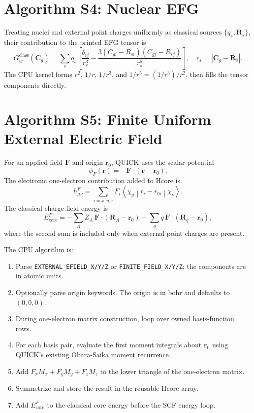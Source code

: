 \documentclass[journal=jcisd8,manuscript=suppinfo]{achemso}
\begin{document}
\section{Algorithm S4: Nuclear EFG}

Treating nuclei and external point charges uniformly as classical sources
\(\{q_s,\mathbf{R}_s\}\), their contribution to the printed EFG tensor is
\begin{equation}
  G_{ij}^{\mathrm{class}}(\mathbf{C}_g)
  =
  \sum_s q_s
  \left[
    \frac{\delta_{ij}}{r_s^3}
    -
    \frac{3(C_{gi}-R_{si})(C_{gj}-R_{sj})}{r_s^5}
  \right],
  \quad
  r_s=|\mathbf{C}_g-\mathbf{R}_s|.
\end{equation}
The CPU kernel forms \(r^2\), \(1/r\), \(1/r^3\), and \(1/r^5=(1/r^3)/r^2\), then fills the tensor components directly.

\section{Algorithm S5: Finite Uniform External Electric Field}

For an applied field \(\mathbf{F}\) and origin \(\mathbf{r}_0\), QUICK uses the scalar potential
\begin{equation}
  \phi_F(\mathbf{r})=-\mathbf{F}\cdot(\mathbf{r}-\mathbf{r}_0).
\end{equation}
The electronic one-electron contribution added to Hcore is
\begin{equation}
  h^F_{\mu\nu}
  =
  \sum_{i=x,y,z}F_i
  \left\langle
    \chi_\mu
    \middle|
    r_i-r_{0i}
    \middle|
    \chi_\nu
  \right\rangle.
\end{equation}
The classical charge-field energy is
\begin{equation}
  E^F_{\mathrm{core}}
  =
  -\sum_A Z_A\,\mathbf{F}\cdot(\mathbf{R}_A-\mathbf{r}_0)
  -
  \sum_q q\,\mathbf{F}\cdot(\mathbf{R}_q-\mathbf{r}_0),
\end{equation}
where the second sum is included only when external point charges are present.

The CPU algorithm is:
\begin{enumerate}
  \item Parse \texttt{EXTERNAL\_EFIELD\_X/Y/Z} or \texttt{FINITE\_FIELD\_X/Y/Z}; the components are in atomic units.
  \item Optionally parse origin keywords.  The origin is in bohr and defaults to \((0,0,0)\).
  \item During one-electron matrix construction, loop over owned basis-function rows.
  \item For each basis pair, evaluate the first moment integrals about \(\mathbf{r}_0\) using QUICK's existing Obara-Saika moment recurrence.
  \item Add \(F_xM_x+F_yM_y+F_zM_z\) to the lower triangle of the one-electron matrix.
  \item Symmetrize and store the result in the reusable Hcore array.
  \item Add \(E^F_{\mathrm{core}}\) to the classical core energy before the SCF energy loop.
\end{enumerate}
\end{document}
